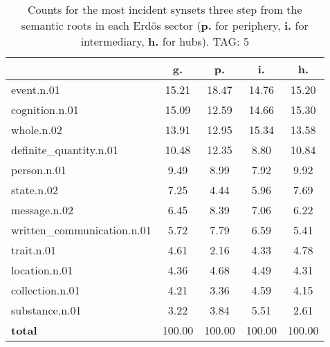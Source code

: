 \begin{table}[h!]
\begin{center}
\begin{tabular}{| l | c | c | c | c |}\hline
 & g. & p. & i. & h. \\\hline
event.n.01 & 15.21  & 18.47  & 14.76  & 15.20 \\\hline
cognition.n.01 & 15.09  & 12.59  & 14.66  & 15.30 \\\hline
whole.n.02 & 13.91  & 12.95  & 15.34  & 13.58 \\\hline
definite\_quantity.n.01 & 10.48  & 12.35  & 8.80  & 10.84 \\\hline
person.n.01 & 9.49  & 8.99  & 7.92  & 9.92 \\\hline
state.n.02 & 7.25  & 4.44  & 5.96  & 7.69 \\\hline
message.n.02 & 6.45  & 8.39  & 7.06  & 6.22 \\\hline
written\_communication.n.01 & 5.72  & 7.79  & 6.59  & 5.41 \\\hline
trait.n.01 & 4.61  & 2.16  & 4.33  & 4.78 \\\hline
location.n.01 & 4.36  & 4.68  & 4.49  & 4.31 \\\hline
collection.n.01 & 4.21  & 3.36  & 4.59  & 4.15 \\\hline
substance.n.01 & 3.22  & 3.84  & 5.51  & 2.61 \\\hline
{{\bf total}} & 100.00  & 100.00  & 100.00  & 100.00 \\\hline
\end{tabular}
\caption{Counts for the most incident synsets three step from the semantic roots in each Erd\"os sector ({\bf p.} for periphery, {\bf i.} for intermediary, {\bf h.} for hubs). TAG: 5}
\end{center}
\end{table}